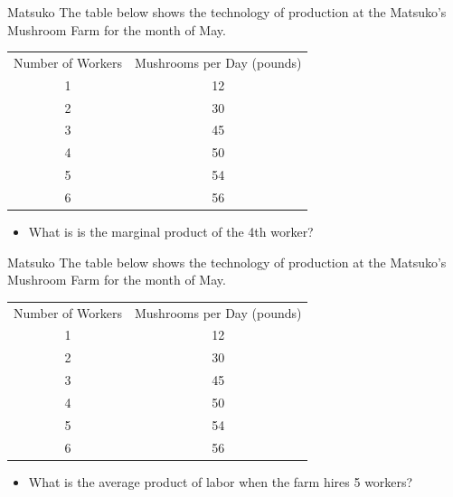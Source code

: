 \documentclass{beamer}
\begin{document}
\begin{frame}[t]{Matsuko}
    The table below shows the technology of production at the Matsuko's Mushroom Farm for the month of May.
    \begin{table}[H]
    \centering
    \begin{tabular}{cc}
    Number of Workers & Mushrooms per Day (pounds) \\
    1                 & 12                         \\ \hline
    2                 & 30                         \\ \hline
    3                 & 45                         \\ \hline
    4                 & 50                         \\ \hline
    5                 & 54                         \\ \hline
    6                 & 56                       
    \end{tabular}
    \end{table}
    \begin{itemize}
        \item What is is the marginal product of the 4th worker?
    \end{itemize}
\end{frame}

\begin{frame}[t]{Matsuko}
    The table below shows the technology of production at the Matsuko's Mushroom Farm for the month of May.
    \begin{table}[H]
    \centering
    \begin{tabular}{cc}
    Number of Workers & Mushrooms per Day (pounds) \\
    1                 & 12                         \\ \hline
    2                 & 30                         \\ \hline
    3                 & 45                         \\ \hline
    4                 & 50                         \\ \hline
    5                 & 54                         \\ \hline
    6                 & 56                       
    \end{tabular}
    \end{table}
    \begin{itemize}
        \item What is the average product of labor when the farm hires 5 workers?
    \end{itemize}
\end{frame}
\end{document}
